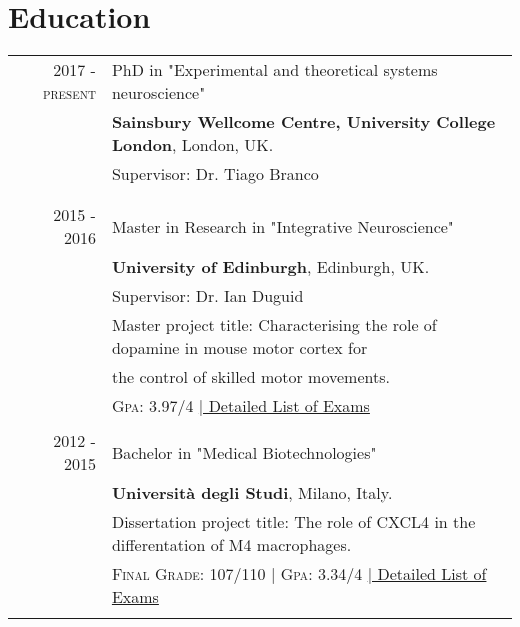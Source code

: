 \documentclass[a4paper,10pt]{article}
\begin{document}
\section{Education}
\begin{tabular}{rl}	


\textsc{2017 - present} & PhD in "Experimental and theoretical systems neuroscience" \\& 
\normalsize\textbf{Sainsbury Wellcome Centre, University College London}, London, UK.\\
& \small Supervisor: Dr. Tiago Branco\\
\\&\\

\textsc{2015 - 2016}& Master in Research in "Integrative Neuroscience" \\& 
\normalsize\textbf{University of Edinburgh}, Edinburgh, UK.\\
& \small Supervisor: Dr. Ian Duguid\\
& \small Master project title: Characterising the role of dopamine in mouse motor cortex for\\
& the control of skilled motor movements.\\
&\textsc{Gpa}: 3.97/4 \hyperlink{grds_usc}{\hfill| \footnotesize Detailed List of Exams}
\\&\\

\textsc{2012 - 2015}& Bachelor in "Medical Biotechnologies" \\& 
\normalsize\textbf{Università degli Studi}, Milano, Italy.\\
& \small Dissertation project title: The role of CXCL4 in the differentation of M4 macrophages.\\
&\textsc{Final Grade}: 107/110 | \textsc{Gpa}: 3.34/4 \hyperlink{grds_usc}{\hfill| \footnotesize Detailed List of Exams}
\\&\\

\end{tabular}

\end{document}
